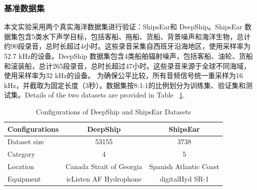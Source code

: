\documentclass[a4paper, 12pt]{article}
\begin{document}
\subsubsection{基准数据集}
本文实验采用两个真实海洋数据集进行验证：ShipsEar\cite{David2016ShipsEar}和 DeepShip\cite{Irfan2021DeepShip}。ShipsEar 数据集包含5类水下声学目标，包括客船、拖船、货船、背景噪声和海洋生物，总计约90段录音，总时长超过4小时。这些录音采集自西班牙沿海地区，使用采样率为52.7 kHz的设备。DeepShip 数据集包含4类船舶辐射噪声，包括客船、油轮、货船和滚装船，总计265段录音，总时长超过47小时。这些录音来源于全球不同海域，使用采样率为32 kHz的设备。
为确保公平比较，所有音频信号统一重采样为16 kHz，并截取为固定长度（3秒）。数据集按8:1:1的比例划分为训练集、验证集和测试集。Details of the two
datasets are provided in Table ~\ref{tab:dataset}.
\begin{table}[htbp]
\centering
\caption{Configurations of DeepShip and ShipsEar Datasets}
\begin{tabular}{l|cc}
\hline
Configurations & DeepShip & ShipsEar \\
\hline
Dataset size & 53155 & 3738 \\
Category     & 4     & 5    \\
Location     & Canada Strait of Georgia & Spanish Atlantic Coast \\
Equipment    & icListen AF Hydrophone   & digitalHyd SR-1 \\
\hline
\end{tabular}
\label{tab:dataset}
\end{table}
\end{document}
